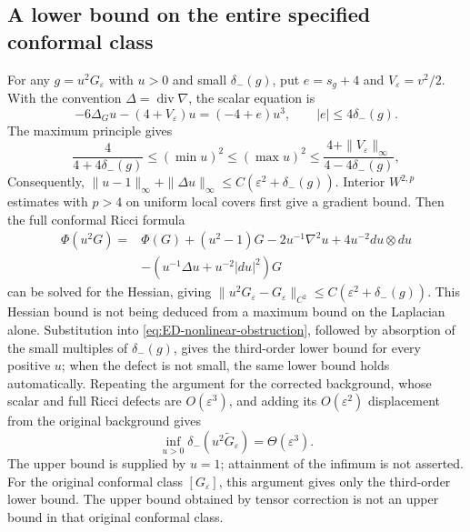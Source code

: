 \documentclass[a4paper,11pt]{article}
\numberwithin{equation}{section}
\theoremstyle{definition}
\begin{document}
\subsection{A lower bound on the entire specified conformal class}\label{sec:ED-conformal}
For any $g=u^2G_\varepsilon$ with $u>0$ and small $\delta_-(g)$,
put $e=s_g+4$ and $V_\varepsilon=v^2/2$.
With the convention $\Delta=\operatorname{div}\nabla$, the scalar equation is
\[
-6\Delta_Gu-(4+V_\varepsilon)u=(-4+e)u^3,\qquad
|e|\le4\delta_-(g).
\]
The maximum principle gives
\[
\frac4{4+4\delta_-(g)}\le(\min u)^2\le(\max u)^2
\le\frac{4+\|V_\varepsilon\|_\infty}{4-4\delta_-(g)},
\]
Consequently, $\|u-1\|_\infty+\|\Delta u\|_\infty
\le C(\varepsilon^2+\delta_-(g))$.
Interior $W^{2,p}$ estimates with $p>4$ on uniform local covers first give a gradient bound.
Then the full conformal Ricci formula
\[
\begin{split}
\Phi(u^2G)={}&\Phi(G)+(u^2-1)G-2u^{-1}\nabla^2u
+4u^{-2}du\otimes du\\
&-(u^{-1}\Delta u+u^{-2}|du|^2)G
\end{split}
\]
can be solved for the Hessian, giving
$\|u^2G_\varepsilon-G_\varepsilon\|_{C^2}
\le C(\varepsilon^2+\delta_-(g))$.
This Hessian bound is not being deduced from a maximum bound on the Laplacian alone.
Substitution into \eqref{eq:ED-nonlinear-obstruction},
followed by absorption of the small multiples of $\delta_-(g)$, gives the third-order lower bound for every positive $u$;
when the defect is not small, the same lower bound holds automatically.
Repeating the argument for the corrected background, whose scalar and full Ricci defects are $O(\varepsilon^3)$,
and adding its $O(\varepsilon^2)$ displacement from the original background gives
\begin{equation}\label{eq:ED-whole-conformal}
\inf_{u>0}\delta_-(u^2\widetilde G_\varepsilon)
=\Theta(\varepsilon^3).
\end{equation}
The upper bound is supplied by $u=1$; attainment of the infimum is not asserted.
For the original conformal class $[G_\varepsilon]$, this argument gives only the third-order lower bound.
The upper bound obtained by tensor correction is not an upper bound in that original conformal class.
\end{document}
